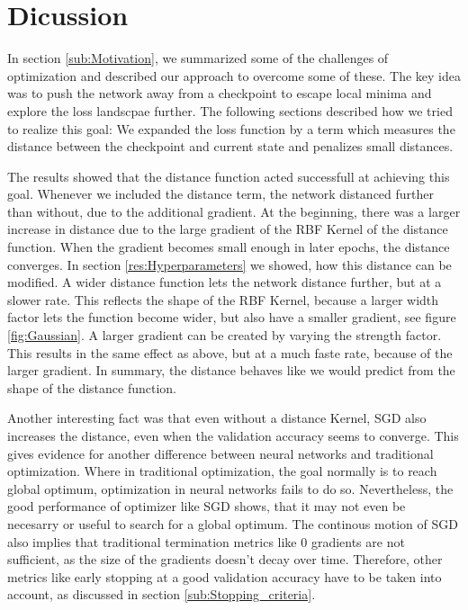 \chapter{Dicussion}

In section \ref{sub:Motivation}, we summarized some of the challenges of
optimization and described our approach to overcome some of these. The key idea
was to push the network away from a checkpoint to escape local minima and
explore the loss landscpae further. The following sections described how we
tried to realize this goal: We expanded the loss function by a term which
measures the distance between the checkpoint and current state and penalizes
small distances.

The results showed that the distance function acted successfull at achieving
this goal. Whenever we included the distance term, the network distanced further
than without, due to the additional gradient. At the beginning, there was a
larger increase in distance due to the large gradient of the RBF Kernel of the
distance function. When the gradient becomes small enough in later epochs, the
distance converges. In section \ref{res:Hyperparameters} we showed, how this
distance can be modified. A wider distance function lets the network distance
further, but at a slower rate. This reflects the shape of the RBF Kernel,
because a larger width factor lets the function become wider, but also have a
smaller gradient, see figure \ref{fig:Gaussian}. A larger gradient can be
created by varying the strength factor. This results in the same effect as
above, but at a much faste rate, because of the larger gradient. In summary, the
distance behaves like we would predict from the shape of the distance function.


Another interesting fact was that even without a distance Kernel,
SGD also increases the distance, even when the validation accuracy seems to
converge. This gives evidence for another difference between neural networks and
traditional optimization. Where in traditional optimization, the goal normally
is to reach global optimum, optimization in neural networks fails to do so.
Nevertheless, the good performance of optimizer like SGD shows, that it may not
even be necesarry or useful to search for a global optimum. The continous motion
of SGD also implies that traditional termination metrics like 0 gradients are
not sufficient, as the size of the gradients doesn't decay over time. Therefore,
other metrics like early stopping at a good validation accuracy have to be taken
into account, as discussed in section \ref{sub:Stopping_criteria}.
\newline

